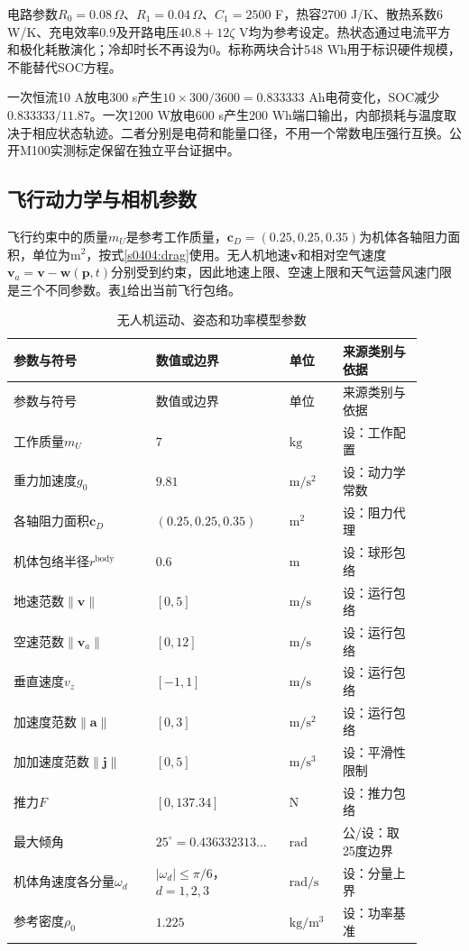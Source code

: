 电路参数$R_0=0.08\,\Omega$、$R_1=0.04\,\Omega$、$C_1=2500$ F，热容2700 J/K、散热系数6 W/K、充电效率0.9及开路电压$40.8+12\zeta$ V均为参考设定。热状态通过电流平方和极化耗散演化；冷却时长不再设为0。标称两块合计548 Wh用于标识硬件规模，不能替代SOC方程。

一次恒流10 A放电300 s产生$10\times300/3600=0.833333$ Ah电荷变化，SOC减少$0.833333/11.87$。一次1200 W放电600 s产生200 Wh端口输出，内部损耗与温度取决于相应状态轨迹。二者分别是电荷和能量口径，不用一个常数电压强行互换。公开M100实测标定保留在独立平台证据中。

\subsection{飞行动力学与相机参数}

飞行约束中的质量$m_U$是参考工作质量，$\mathbf c_D=(0.25,0.25,0.35)$为机体各轴阻力面积，单位为m$^2$，按式\eqref{s0404:drag}使用。无人机地速$\mathbf v$和相对空气速度$\mathbf v_a=\mathbf v-\mathbf w(\mathbf p,t)$分别受到约束，因此地速上限、空速上限和天气运营风速门限是三个不同参数。表\ref{s0601:flight_parameters}给出当前飞行包络。

\begin{longtable}{@{}p{0.32\linewidth}p{0.28\linewidth}p{0.12\linewidth}p{0.18\linewidth}@{}}
\caption{无人机运动、姿态和功率模型参数}\label{s0601:flight_parameters}\\
\toprule
参数与符号 & 数值或边界 & 单位 & 来源类别与依据\\
\midrule
\endfirsthead
\toprule
参数与符号 & 数值或边界 & 单位 & 来源类别与依据\\
\midrule
\endhead
\bottomrule
\endfoot
工作质量$m_U$ & $7$ & $\mathrm{kg}$ & 设：工作配置\\
重力加速度$g_0$ & $9.81$ & $\mathrm{m/s^2}$ & 设：动力学常数\\
各轴阻力面积$\mathbf c_D$ & $(0.25,0.25,0.35)$ & $\mathrm m^2$ & 设：阻力代理\\
机体包络半径$r^{\mathrm{body}}$ & $0.6$ & $\mathrm m$ & 设：球形包络\\
地速范数$\|\mathbf v\|$ & $[0,5]$ & $\mathrm{m/s}$ & 设：运行包络\\
空速范数$\|\mathbf v_a\|$ & $[0,12]$ & $\mathrm{m/s}$ & 设：运行包络\\
垂直速度$v_z$ & $[-1,1]$ & $\mathrm{m/s}$ & 设：运行包络\\
加速度范数$\|\mathbf a\|$ & $[0,3]$ & $\mathrm{m/s^2}$ & 设：运行包络\\
加加速度范数$\|\mathbf j\|$ & $[0,5]$ & $\mathrm{m/s^3}$ & 设：平滑性限制\\
推力$F$ & $[0,137.34]$ & $\mathrm N$ & 设：推力包络\\
最大倾角 & $25^\circ=0.436332313\ldots$ & $\mathrm{rad}$ & 公/设：取25度边界\\
机体角速度各分量$\omega_d$ & $|\omega_d|\le\pi/6$，$d=1,2,3$ & $\mathrm{rad/s}$ & 设：分量上界\\
参考密度$\rho_0$ & $1.225$ & $\mathrm{kg/m^3}$ & 设：功率基准\\
\end{longtable}

